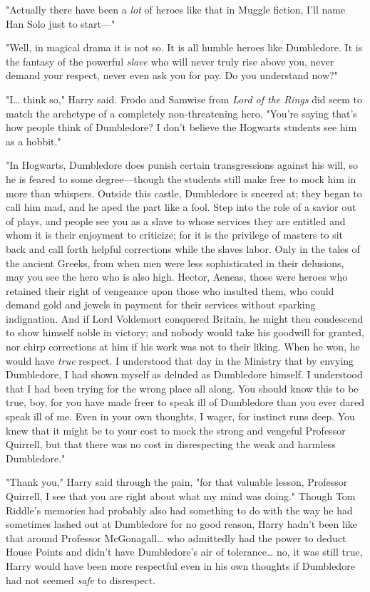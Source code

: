 "Actually there have been a \emph{lot} of heroes like that in Muggle fiction,
I'll name Han Solo just to start---"

"Well, in magical drama it is not so. It is all humble heroes like Dumbledore.
It is the fantasy of the powerful \emph{slave} who will never truly rise above
you, never demand your respect, never even ask you for pay. Do you understand
now?"

"I{\ldots} think so," Harry said. Frodo and Samwise from \emph{Lord of the
Rings} did seem to match the archetype of a completely non-threatening hero.
"You're saying that's how people think of Dumbledore? I don't believe the
Hogwarts students see him as a hobbit."

"In Hogwarts, Dumbledore does punish certain transgressions against his will,
so he is feared to some degree---though the students still make free to mock
him in more than whispers. Outside this castle, Dumbledore is sneered at; they
began to call him mad, and he aped the part like a fool. Step into the role of
a savior out of plays, and people see you as a slave to whose services they are
entitled and whom it is their enjoyment to criticize; for it is the privilege
of masters to sit back and call forth helpful corrections while the slaves
labor. Only in the tales of the ancient Greeks, from when men were less
sophisticated in their delusions, may you see the hero who is also high.
Hector, Aeneas, those were heroes who retained their right of vengeance upon
those who insulted them, who could demand gold and jewels in payment for their
services without sparking indignation. And if Lord Voldemort conquered Britain,
he might then condescend to show himself noble in victory; and nobody would
take his goodwill for granted, nor chirp corrections at him if his work was not
to their liking. When he won, he would have \emph{true} respect. I understood
that day in the Ministry that by envying Dumbledore, I had shown myself as
deluded as Dumbledore himself. I understood that I had been trying for the
wrong place all along. You should know this to be true, boy, for you have made
freer to speak ill of Dumbledore than you ever dared speak ill of me. Even in
your own thoughts, I wager, for instinct runs deep. You knew that it might be
to your cost to mock the strong and vengeful Professor Quirrell, but that there
was no cost in disrespecting the weak and harmless Dumbledore."

"Thank you," Harry said through the pain, "for that valuable lesson, Professor
Quirrell, I see that you are right about what my mind was doing." Though Tom
Riddle's memories had probably also had something to do with the way he had
sometimes lashed out at Dumbledore for no good reason, Harry hadn't been like
that around Professor McGonagall{\ldots} who admittedly had the power to deduct
House Points and didn't have Dumbledore's air of tolerance{\ldots} no, it was
still true, Harry would have been more respectful even in his own thoughts if
Dumbledore had not seemed \emph{safe} to disrespect.

